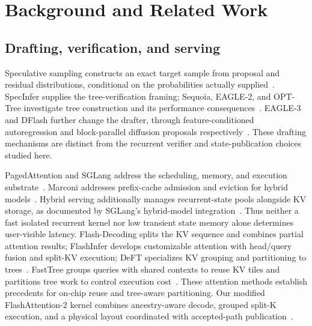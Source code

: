 \documentclass[conference]{IEEEtran}
\begin{document}
\section{Background and Related Work}
\label{sec:related}
\subsection{Drafting, verification, and serving}
Speculative sampling constructs an exact target sample from proposal and residual distributions, conditional on the probabilities actually supplied~\cite{leviathan2023fast,chen2023sampling}. SpecInfer supplies the tree-verification framing; Sequoia, EAGLE-2, and OPT-Tree investigate tree construction and its performance consequences~\cite{miao2023specinfer,chen2024sequoia,li2024eagle,wang2024opt}. EAGLE-3 and DFlash further change the drafter, through feature-conditioned autoregression and block-parallel diffusion proposals respectively~\cite{li2025eagle3,chen2026dflash}. These drafting mechanisms are distinct from the recurrent verifier and state-publication choices studied here.

PagedAttention and SGLang address the scheduling, memory, and execution substrate~\cite{kwon2023efficient,zheng2024sglang}. Marconi addresses prefix-cache admission and eviction for hybrid models~\cite{pan2024marconi}. Hybrid serving additionally manages recurrent-state pools alongside KV storage, as documented by SGLang's hybrid-model integration~\cite{pytorch2025sglang,sglang2026qwen}. Thus neither a fast isolated recurrent kernel nor low transient state memory alone determines user-visible latency. Flash-Decoding splits the KV sequence and combines partial attention results; FlashInfer develops customizable attention with head/query fusion and split-KV execution; DeFT specializes KV grouping and partitioning to trees~\cite{dao2023flashdecoding,ye2025flashinfer,yao2024deft}. FastTree groups queries with shared contexts to reuse KV tiles and partitions tree work to control execution cost~\cite{pan2025fasttree}. These attention methods establish precedents for on-chip reuse and tree-aware partitioning. Our modified FlashAttention-2 kernel combines ancestry-aware decode, grouped split-K execution, and a physical layout coordinated with accepted-path publication~\cite{dao2023flashattention,lumo2026archive}.
\end{document}
